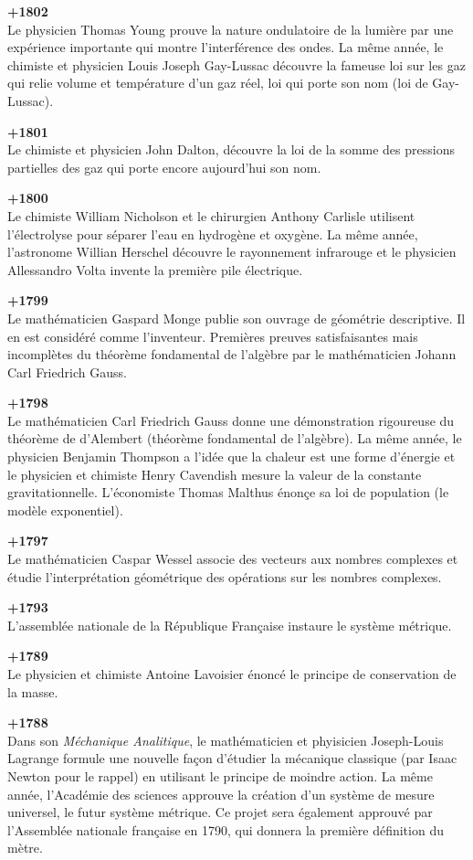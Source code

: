 \textbf{+1802}\\
Le physicien Thomas Young prouve la nature ondulatoire de la lumière par une expérience importante qui montre l'interférence des ondes. La même année, le chimiste et physicien Louis Joseph Gay-Lussac découvre la fameuse loi sur les gaz qui relie volume et température d'un gaz réel, loi qui porte son nom (loi de Gay-Lussac).

\textbf{+1801}\\
Le chimiste et physicien John Dalton, découvre la loi de la somme des pressions partielles des gaz qui porte encore aujourd'hui son nom.

\textbf{+1800}\\
Le chimiste William Nicholson et le chirurgien Anthony Carlisle utilisent l'électrolyse pour séparer l'eau en hydrogène et oxygène. La même année, l'astronome Willian Herschel découvre le rayonnement infrarouge et le physicien Allessandro Volta invente la première pile électrique.

\textbf{+1799}\\
Le mathématicien Gaspard Monge publie son ouvrage de géométrie descriptive. Il en est considéré comme l'inventeur. Premières preuves satisfaisantes mais incomplètes du théorème fondamental de l'algèbre par le mathématicien Johann Carl Friedrich Gauss.

\textbf{+1798}\\
Le mathématicien Carl Friedrich Gauss donne une démonstration rigoureuse du théorème de d'Alembert (théorème fondamental de l'algèbre). La même année, le physicien Benjamin Thompson a l'idée que la chaleur est une forme d'énergie et le physicien et chimiste Henry Cavendish mesure la valeur de la constante gravitationnelle. L'économiste Thomas Malthus énonçe sa loi de population (le modèle exponentiel).

\textbf{+1797}\\
Le mathématicien Caspar Wessel associe des vecteurs aux nombres complexes et étudie l'interprétation géométrique des opérations sur les nombres complexes.

\textbf{+1793}\\
L'assemblée nationale de la République Française instaure le système métrique.

\textbf{+1789}\\
Le physicien et chimiste Antoine Lavoisier énoncé le principe de conservation de la masse.

\textbf{+1788}\\
Dans son \textit{Méchanique Analitique}, le mathématicien et phyisicien Joseph-Louis Lagrange formule une nouvelle façon d'étudier la mécanique classique (par Isaac Newton pour le rappel) en utilisant le principe de moindre action. La même année, l'Académie des sciences approuve la création d'un système de mesure universel, le futur système métrique. Ce projet sera également approuvé par l'Assemblée nationale française en 1790, qui donnera la première définition du mètre.

